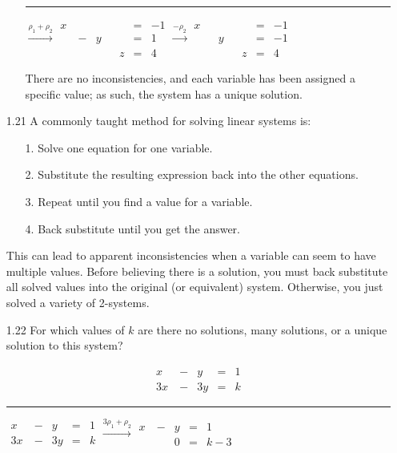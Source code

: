\documentclass{article}
\begin{document}
\begin{enumerate}
\begin{enumerate}
\hrule

$\overset{\rho_1+\rho_2}{\longrightarrow}
\begin{aligned}
x&&&&&=&-1\\
&\ -&y&&&=&1\\
&&&&z&=&4
\end{aligned}
\overset{-\rho_2}{\longrightarrow}
\begin{aligned}
x&&&&&=&-1\\
&&y&&&=&-1\\
&&&&z&=&4
\end{aligned}$

There are no inconsistencies, and each variable has been assigned a specific value; as such, the system has a unique solution.

\end{enumerate}

\item[1.21] A commonly taught method for solving linear systems is:

\begin{itemize}

\item[1.] Solve one equation for one variable.

\item[2.] Substitute the resulting expression back into the other equations.

\item[3.] Repeat until you find a value for a variable.

\item[4.] Back substitute until you get the answer.

\end{itemize}

This can lead to apparent inconsistencies when a variable can seem to have multiple values. Before believing there is a solution, you must back substitute all solved values into the original (or equivalent) system. Otherwise, you just solved a variety of 2-systems.

\item[1.22] For which values of $k$ are there no solutions, many solutions, or a unique solution to this system?

\[\begin{aligned}
x&\ -&y&=&1\\
3x&\ -&3y&=&k
\end{aligned}\]

\hrule

$\begin{aligned}
x&\ -&y&=&1\\
3x&\ -&3y&=&k
\end{aligned}
\overset{3\rho_1+\rho_2}{\longrightarrow}
\begin{aligned}
x&\ -&y&=&1\\
&&0&=&k-3
\end{aligned}$


\end{enumerate}
\end{document}
